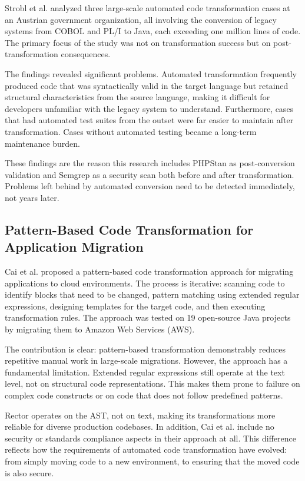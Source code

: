 Strobl et al. \cite{strobl2020automated} analyzed three large-scale automated code transformation cases at an Austrian government organization, all involving the conversion of legacy systems from COBOL and PL/I to Java, each exceeding one million lines of code. The primary focus of the study was not on transformation success but on post-transformation consequences.

The findings revealed significant problems. Automated transformation frequently produced code that was syntactically valid in the target language but retained structural characteristics from the source language, making it difficult for developers unfamiliar with the legacy system to understand. Furthermore, cases that had automated test suites from the outset were far easier to maintain after transformation. Cases without automated testing became a long-term maintenance burden.

These findings are the reason this research includes PHPStan as post-conversion validation and Semgrep as a security scan both before and after transformation. Problems left behind by automated conversion need to be detected immediately, not years later.

\subsection{Pattern-Based Code Transformation for Application Migration}

Cai et al. \cite{cai2015pattern} proposed a pattern-based code transformation approach for migrating applications to cloud environments. The process is iterative: scanning code to identify blocks that need to be changed, pattern matching using extended regular expressions, designing templates for the target code, and then executing transformation rules. The approach was tested on 19 open-source Java projects by migrating them to Amazon Web Services (AWS).

The contribution is clear: pattern-based transformation demonstrably reduces repetitive manual work in large-scale migrations. However, the approach has a fundamental limitation. Extended regular expressions still operate at the text level, not on structural code representations. This makes them prone to failure on complex code constructs or on code that does not follow predefined patterns.

Rector \cite{rector2024} operates on the AST, not on text, making its transformations more reliable for diverse production codebases. In addition, Cai et al. \cite{cai2015pattern} include no security or standards compliance aspects in their approach at all. This difference reflects how the requirements of automated code transformation have evolved: from simply moving code to a new environment, to ensuring that the moved code is also secure.

